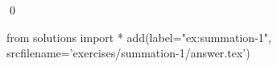 
\begin{ex} 
  \label{ex:summation-1}
  
  \qed
\end{ex} 
\begin{python0}
from solutions import *
add(label="ex:summation-1",
    srcfilename='exercises/summation-1/answer.tex') 
\end{python0}
